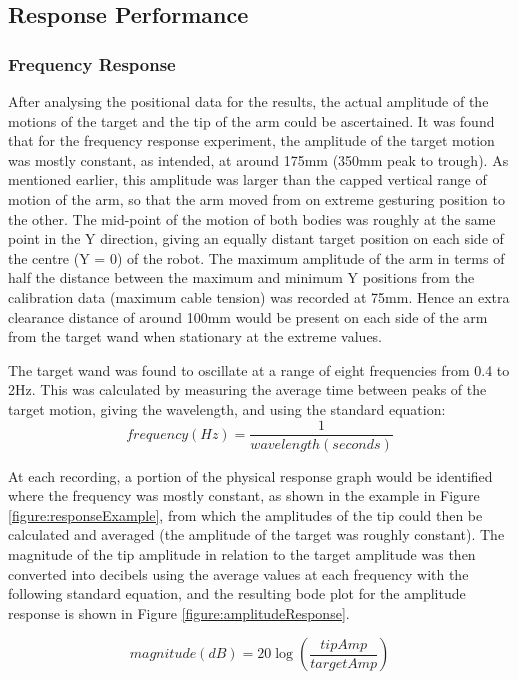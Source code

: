 \documentclass[11pt]{article}
\begin{document}
\subsection{Response Performance}
\subsubsection{Frequency Response}

After analysing the positional data for the results, the actual amplitude of the motions of the target and the tip of the arm could be ascertained. It was found that for the frequency response experiment, the amplitude of the target motion was mostly constant, as intended, at around 175mm (350mm peak to trough). As mentioned earlier, this amplitude was larger than the capped vertical range of motion of the arm, so that the arm moved from on extreme gesturing position to the other. The mid-point of the motion of both bodies was roughly at the same point in the Y direction, giving an equally distant target position on each side of the centre (Y = 0) of the robot. The maximum amplitude of the arm in terms of half the distance between the maximum and minimum Y positions from the calibration data (maximum cable tension) was recorded at 75mm. Hence an extra clearance distance of around 100mm would be present on each side of the arm from the target wand when stationary at the extreme values. 

The target wand was found to oscillate at a range of eight frequencies from 0.4 to 2Hz. This was calculated by measuring the average time between peaks of the target motion, giving the wavelength, and using the standard equation:
\begin{equation}
frequency(Hz) = \frac{1}{wavelength(seconds)}
\end{equation}

At each recording, a portion of the physical response graph would be identified where the frequency was mostly constant, as shown in the example in Figure \ref{figure:responseExample}, from which the amplitudes of the tip could then be calculated and averaged (the amplitude of the target was roughly constant). The magnitude of the tip amplitude in relation to the target amplitude was then converted into decibels using the average values at each frequency with the following standard equation, and the resulting bode plot for the amplitude response is shown in Figure \ref{figure:amplitudeResponse}.

\begin{equation}
magnitude(dB) = 20\log \left(\frac{tipAmp}{targetAmp}\right)
\end{equation}
\end{document}
